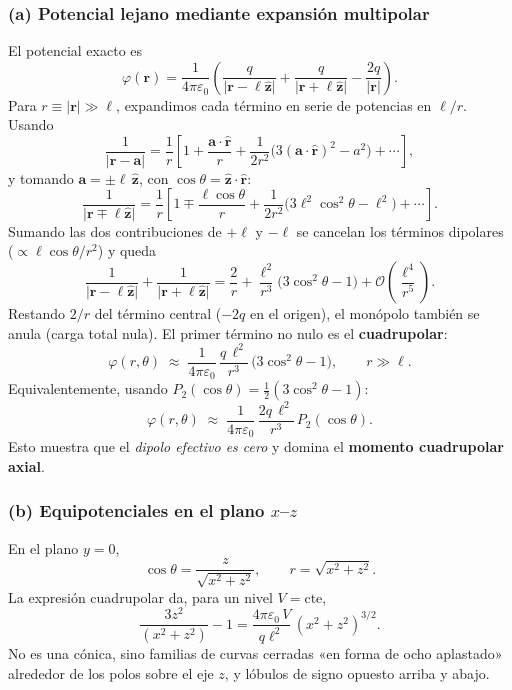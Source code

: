 \documentclass{article}
\begin{document}
\subsubsection*{(a) Potencial lejano mediante expansión multipolar}
El potencial exacto es
\[
\varphi(\mathbf r)=\frac{1}{4\pi\varepsilon_0}\!\left(
\frac{q}{\lvert \mathbf r-\ell\hat{\mathbf z}\rvert}
+\frac{q}{\lvert \mathbf r+\ell\hat{\mathbf z}\rvert}
-\frac{2q}{\lvert \mathbf r\rvert}
\right).
\]
Para $r\equiv\lvert\mathbf r\rvert\gg \ell$, expandimos cada término en serie de potencias en $\ell/r$. Usando
\[
\frac{1}{\lvert \mathbf r-\mathbf a\rvert}
=\frac{1}{r}\left[1+\frac{\mathbf a\!\cdot\!\hat{\mathbf r}}{r}
+\frac{1}{2r^{2}}\Big(3(\mathbf a\!\cdot\!\hat{\mathbf r})^{2}-a^{2}\Big)+\cdots\right],
\]
y tomando $\mathbf a=\pm \ell\,\hat{\mathbf z}$, con $\cos\theta=\hat{\mathbf z}\!\cdot\!\hat{\mathbf r}$:
\[
\frac{1}{\lvert \mathbf r\mp \ell\hat{\mathbf z}\rvert}
=\frac{1}{r}\left[1\mp\frac{\ell\cos\theta}{r}
+\frac{1}{2r^{2}}\Big(3\ell^{2}\cos^{2}\theta-\ell^{2}\Big)+\cdots\right].
\]
Sumando las dos contribuciones de $+\ell$ y $-\ell$ se cancelan los términos dipolares ($\propto \ell\cos\theta/r^{2}$) y queda
\[
\frac{1}{\lvert \mathbf r-\ell\hat{\mathbf z}\rvert}
+\frac{1}{\lvert \mathbf r+\ell\hat{\mathbf z}\rvert}
=\frac{2}{r}+\frac{\ell^{2}}{r^{3}}\Big(3\cos^{2}\theta-1\Big)+\mathcal O\!\left(\frac{\ell^{4}}{r^{5}}\right).
\]
Restando $2/r$ del término central ($-2q$ en el origen), el monópolo también se anula (carga total nula). El primer término no nulo es el \textbf{cuadrupolar}:
\[
\boxed{\ \varphi(r,\theta)\;\approx\;\frac{1}{4\pi\varepsilon_0}\,
\frac{q\,\ell^{2}}{r^{3}}\,\Big(3\cos^{2}\theta-1\Big),\qquad r\gg \ell.\ }
\]
Equivalentemente, usando $P_{2}(\cos\theta)=\tfrac{1}{2}(3\cos^{2}\theta-1)$:
\[
\boxed{\ \varphi(r,\theta)\;\approx\;\frac{1}{4\pi\varepsilon_0}\,
\frac{2q\,\ell^{2}}{r^{3}}\,P_{2}(\cos\theta). \ }
\]
Esto muestra que el \emph{dipolo efectivo es cero} y domina el \textbf{momento cuadrupolar axial}.

\subsubsection*{(b) Equipotenciales en el plano $x$–$z$}
En el plano $y=0$,
\[
\cos\theta=\frac{z}{\sqrt{x^{2}+z^{2}}},\qquad 
r=\sqrt{x^{2}+z^{2}}.
\]
La expresión cuadrupolar da, para un nivel $V=\text{cte}$,
\[
\frac{3z^{2}}{(x^{2}+z^{2})}-1=\frac{4\pi\varepsilon_0\,V}{q\ell^{2}}\,(x^{2}+z^{2})^{3/2}.
\]
No es una cónica, sino familias de curvas cerradas «en forma de ocho aplastado» alrededor de los polos sobre el eje $z$, y lóbulos de signo opuesto arriba y abajo.
\end{document}
